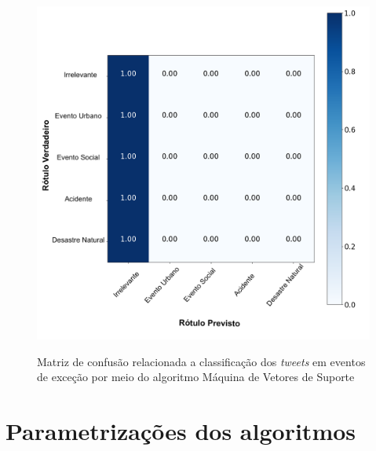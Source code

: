 \documentclass[
	12pt,				%
	oneside,			%
	a4paper,			%
	english,			%
	brazil				%
	]{abntex2ppgsi}
\begin{document}
{{{\begin{apendicesenv}
\begin{figure}[!htb]
	\centering
 	  \caption{Matriz de confusão relacionada a classificação dos \textit{tweets} em eventos de exceção por meio do algoritmo Máquina de Vetores de Suporte}
		\includegraphics[width=1\linewidth]{images/confusion_matrix_svm_pt.png}
	\label{fig:confusion_matrix_svm}
\end{figure}

\chapter{Parametrizações dos algoritmos}
\label{apendiceF}


\end{apendicesenv}}}}
\end{document}
